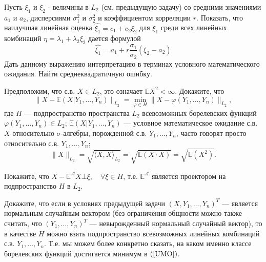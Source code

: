 \begin{problem}
Пусть  $\xi_1$ и  $\xi_2$ - величины в $L_2$ (см. предыдущую задачу) со средними значениями $a_1$ и $a_2$, дисперсиями $\sigma_1^2$ и $\sigma_2^2$ 
и коэффициентом корреляции $r$. Показать, что наилучшая линейная оценка 
$\widehat{\xi_1}  = c_1 + c_2 \xi_2$ для $\xi_1$ среди всех линейных комбинаций $\eta  = \lambda_1 + \lambda_2 \xi_2$  дается формулой 
\[
\widehat{\xi_1}  = a_1 + r \frac{\sigma_1}{\sigma_2} (\xi_2 - a_2)
\]
Дать данному выражению интерпретацию в терминах условного математического ожидания. Найти среднеквадратичную ошибку.
\end{problem}

\begin{problem}
Предположим, что с.в. $X\in L_2$, это означает ${\mathbb E}X^2<\infty$. Докажите, что 
\begin{equation}
\label{UMO}
\| X-{\mathbb E}(X|Y_1,\ldots,Y_n)\|_{L_2}=\min\limits_{\varphi\in H} \| X-\varphi(Y_1,\ldots,Y_n)\|_{L_2} , 
\end{equation}
где $H$ --- подпространство пространства $L_2$ всевозможных борелевских функций $\varphi(Y_1,\ldots,Y_n)\in L_2$; 
${\mathbb E}(X|Y_1,\ldots,Y_n)$ --- условное математическое ожидание с.в. $X$ относительно $\sigma$-алгебры, порожденной с.в. 
$Y_1,\ldots,Y_n$, часто говорят просто относительно с.в. $Y_1,\ldots,Y_n$; 
$$
\| X\|_{L_2}=\sqrt{\langle X,X\rangle_{L_2}}=\sqrt{{\mathbb E}(X\cdot X)}=\sqrt{{\mathbb E}(X^2)} . 
$$
\end{problem}

\begin{ordre}
Покажите, что $X-{\mathbb E}^{\mathcal A}X \bot \xi,\quad \forall\xi\in H$, т.е. ${\mathbb E}^{\mathcal A}$ 
является проектором на подпространство $H$ в $L_2$. 
\end{ordre}


\begin{problem}
Докажите, что если в условиях предыдущей задачи $(X,Y_1,\ldots,Y_n)^T$ --- является нормальным случайным вектором (без ограничения 
общности можно также считать, что $(Y_1,\ldots,Y_n)^T$  --- невырожденный нормальный случайный вектор), то в качестве $H$ можно взять 
подпространство всевозможных линейных комбинаций с.в. $Y_1,\ldots,Y_n$. Т.е. мы можем более конкретно сказать, на каком именно 
классе борелевских функций достигается минимум в $(\ref{UMO})$. 
\end{problem}

